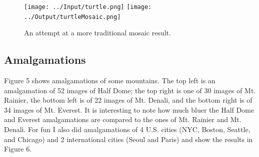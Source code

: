 \documentclass[letterpaper,12pt]{article}
\begin{document}
\begin{figure}
	\centering
	\texttt{[image: ../Input/turtle.png]}
	\texttt{[image: ../Output/turtleMosaic.png]}
	\caption{An attempt at a more traditional mosaic result.}
\end{figure}

\subsection{Amalgamations}
Figure 5 shows amalgamations of some mountains. The top left is an amalgamation of 52 images of Half Dome; the top right is one of 30 images of Mt. Rainier, the bottom left is of 22 images of Mt. Denali, and the bottom right is of 34 images of Mt. Everest. It is interesting to note how much bluer the Half Dome and Everest amalgamations are compared to the ones of Mt. Rainier and Mt. Denali. For fun I also did amalgamations of 4 U.S. cities (NYC, Boston, Seattle, and Chicago) and 2 international cities (Seoul and Paris) and show the results in Figure 6.
\end{document}
